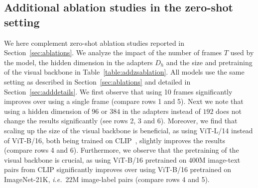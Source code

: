\begin{table}[t]
\begin{center}
\setlength\tabcolsep{1pt}
\vspace{+0.2cm}
\caption{\small Impact of the prompt on the zero-shot multiple-choice VideoQA performance.}
\label{table:promptmc}
\end{center}
\end{table}

\subsection{Additional ablation studies in the zero-shot setting}\label{sec:addzs}
We here complement zero-shot ablation studies reported in Section~\ref{sec:ablations}. 
We analyze the impact of the number of frames $T$ used by the model, the hidden dimension in the adapters $D_h$ and the size and pretraining of the visual backbone in Table~\ref{table:addzsablation}.
All models use the same setting as described in Section~\ref{sec:ablations} and detailed in Section~\ref{sec:adddetails}.
We first observe that using 10 frames significantly improves over using a single frame (compare rows 1 and 5).
Next we note that using a hidden dimension of $96$ or $384$ in the adapters instead of $192$ does not change the results significantly (see rows 2, 3 and 6).
Moreover, we find that scaling up the size of the visual backbone is beneficial, as using ViT-L/14 instead of ViT-B/16, both being trained on CLIP~\cite{radford2021learning}, slightly improves the results (compare rows 4 and 6).
Furthermore, we observe that the pretraining of the visual backbone is crucial, as using ViT-B/16 pretrained on 400M image-text pairs from CLIP significantly improves over using ViT-B/16 pretrained on ImageNet-21K, \textit{i.e.}~22M image-label pairs (compare rows 4 and 5).

